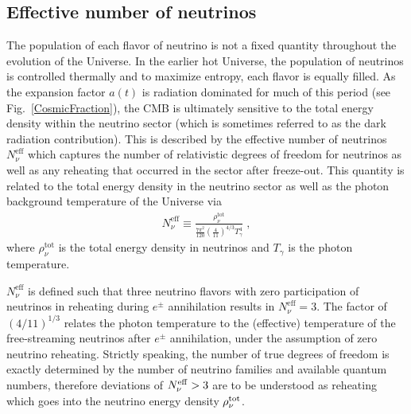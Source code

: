 \documentclass[universe,article,submit,moreauthors,pdftex,a4paper]{Definitions/mdpi}
\newcommand*{\rf}[1]{Fig.~{\ref{#1}}}
\begin{document}
\subsection{Effective number of neutrinos}\label{sec:EffectiveNeutrino}
\noindent The population of each flavor of neutrino is not a fixed quantity throughout the evolution of the Universe. In the earlier hot Universe, the population of neutrinos is controlled thermally and to maximize entropy, each flavor is equally filled. As the expansion factor $a(t)$ is radiation dominated for much of this period (see \rf{CosmicFraction}), the CMB is ultimately sensitive to the total energy density within the neutrino sector (which is sometimes referred to as the dark radiation contribution). 
This is described by the effective number of neutrinos $N_{\nu}^{\mathrm{eff}}$ which captures the number of relativistic degrees of freedom for neutrinos as well as any reheating that occurred in the sector after freeze-out. This quantity is related to the total energy density in the neutrino sector as well as the photon background temperature of the Universe via
\begin{align}\label{Neff}
N_\nu^{\mathrm{eff}}\equiv\frac{\rho^{\mathrm{tot}}_\nu}{\frac{7\pi^2}{120}\left(\frac{4}{11}\right)^{4/3}T_\gamma^4}\;,
\end{align}
where $\rho_\nu^{\mathrm{tot}}$ is the total energy density in neutrinos and $T_\gamma$ is the photon temperature. 

$N_\nu^{\mathrm{eff}}$ is defined such that three neutrino flavors with zero participation of neutrinos in reheating during $e^\pm$ annihilation results in $N_\nu^{\mathrm{eff}}=3$. The factor of $\left(4/11\right)^{1/3}$ relates the photon temperature to the (effective) temperature of the free-streaming neutrinos after $e^\pm$ annihilation, under the assumption of zero neutrino reheating. Strictly speaking, the number of true degrees of freedom is exactly determined by the number of neutrino families and available quantum numbers, therefore deviations of $N_{\nu}^{{\rm eff}}>3$ are to be understood as reheating which goes into the neutrino energy density $\rho_{\nu}^{{\rm tot}}$.
\end{document}
